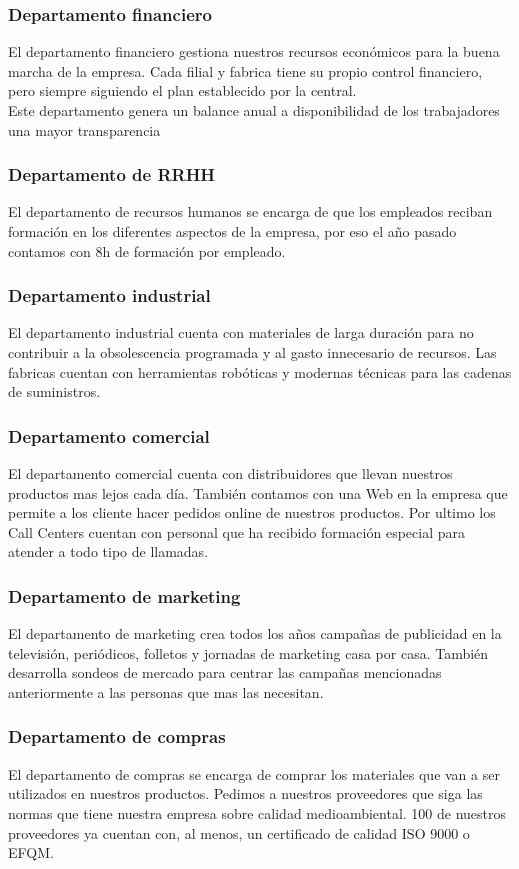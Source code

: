 \documentclass[a4paper]{article}
\begin{document}
\subsubsection{Departamento financiero}
El departamento financiero gestiona nuestros recursos económicos para la buena marcha de la empresa. Cada filial y fabrica tiene su propio control financiero, pero siempre siguiendo el plan establecido por la central.\\
Este departamento genera un balance anual a disponibilidad de los trabajadores una mayor transparencia 
\subsubsection{Departamento de RRHH}
El departamento de recursos humanos se encarga de que los empleados reciban formación en los diferentes aspectos de la empresa, por eso el año pasado contamos con 8h de formación por empleado.
\subsubsection{Departamento industrial}
El departamento industrial cuenta con materiales de larga duración para no contribuir a la obsolescencia programada y al gasto innecesario de recursos. Las fabricas cuentan con herramientas robóticas y modernas técnicas para las cadenas de suministros.
\subsubsection{Departamento comercial}
El departamento comercial cuenta con distribuidores que llevan nuestros productos mas lejos cada día. También contamos con una Web en la empresa que permite a los cliente hacer pedidos online de nuestros productos. Por ultimo los Call Centers cuentan con personal que ha recibido formación especial para atender a todo tipo de llamadas.
\subsubsection{Departamento de marketing}
El departamento de marketing crea todos los años campañas de publicidad en la televisión, periódicos, folletos y jornadas de marketing casa por casa. También desarrolla sondeos de mercado para centrar las campañas mencionadas anteriormente a las personas que mas las necesitan.
\subsubsection{Departamento de compras}
El departamento de compras se encarga de comprar los materiales que van a ser utilizados en nuestros productos. Pedimos a nuestros proveedores que siga las normas que tiene nuestra empresa sobre calidad medioambiental. 100 de nuestros proveedores ya cuentan con, al menos, un certificado de calidad ISO 9000 o EFQM.
\end{document}
